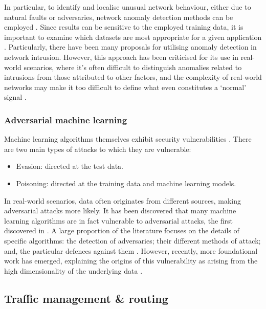 \documentclass[twocolumn, aps, rmp, amsmath, amssymb, nofootinbib, superscriptaddress, longbibliography, floatfix, table-of-contents, eqsecnum]{revtex4}
\begin{document}
In particular, to identify and localise unusual network behaviour, either due to natural faults or adversaries, network anomaly detection methods can be employed \cite{bib:ahmed2007machine, bib:fraley2017promise, bib:joseph2013machine}. Since results can be sensitive to the employed training data, it is important to examine which datasets are most appropriate for a given application \cite{bib:yavanoglu2017review}. Particularly, there have been many proposals for utilising anomaly detection in network intrusion. However, this approach has been criticised for its use in real-world scenarios, where it's often difficult to distinguish anomalies related to intrusions from those attributed to other factors, and the complexity of real-world networks may make it too difficult to define what even constitutes a `normal' signal \cite{bib:sommer2010outside}.

\subsubsection{Adversarial machine learning}

Machine learning algorithms themselves exhibit security vulnerabilities \cite{bib:huang2011adversarial}. There are two main types of attacks to which they are vulnerable:
\begin{itemize}
\item Evasion: directed at the test data.
\item Poisoning: directed at the training data and machine learning models.
\end{itemize}

In real-world scenarios, data often originates from different sources, making adversarial attacks more likely. It has been discovered that many machine learning algorithms are in fact vulnerable to adversarial attacks, the first discovered in \cite{bib:szegedy2013intriguing}. A large proportion of the literature focuses on the details of specific algorithms: the detection of adversaries; their different methods of attack; and, the particular defences against them \cite{bib:kurakin2018adversarial}. However, recently, more foundational work has emerged, explaining the origins of this vulnerability as arising from the high dimensionality of the underlying data \cite{bib:goodfellow2014explaining, bib:gilmer2018adversarial, bib:mahloujifar2018curse}.

\subsection{Traffic management \& routing }
\end{document}
